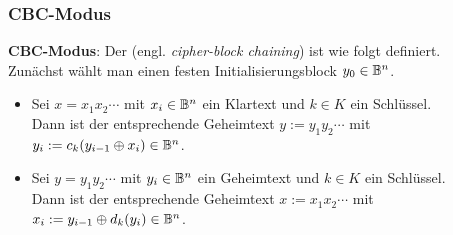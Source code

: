 \pagebreak

\subsubsection{%
    CBC-Modus%
}

\textbf{CBC-Modus}:
Der  (engl. \emph{cipher-block chaining}) ist wie folgt definiert.\\
Zunächst wählt man einen festen Initialisierungsblock $y_0 \in \mathbb{B}^n$.
\begin{itemize}
    \item
    Sei $x = x_1 x_2 \cdots$ mit $x_i \in \mathbb{B}^n$ ein Klartext und $k \in K$ ein Schlüssel.\\
    Dann ist der entsprechende Geheimtext $y := y_1 y_2 \cdots$ mit
    $y_i := c_k(y_{i-1} \oplus x_i) \in \mathbb{B}^n$.

    \item
    Sei $y = y_1 y_2 \cdots$ mit $y_i \in \mathbb{B}^n$ ein Geheimtext und $k \in K$ ein Schlüssel.\\
    Dann ist der entsprechende Geheimtext $x := x_1 x_2 \cdots$ mit
    $x_i := y_{i-1} \oplus d_k(y_i) \in \mathbb{B}^n$.
\end{itemize}
